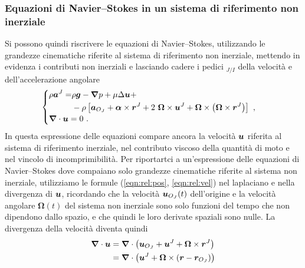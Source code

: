 \subsubsection{Equazioni di Navier--Stokes in un sistema di riferimento non inerziale}
Si possono quindi riscrivere le equazioni di Navier--Stokes, utilizzando le grandezze cinematiche riferite al sistema di riferimento non inerziale, mettendo in evidenza i contributi non inerziali e lasciando cadere i pedici $_{J/I}$ della velocità e dell'accelerazione angolare
\begin{equation}
\begin{cases}
\begin{aligned}
 \rho \bm{a}^J = &  \rho \bm{g} - \bm{\nabla} p + \mu \Delta \bm{u} + \\
               & - \rho \left[
   \bm{a}_{O_J} + \bm{\alpha} \times \bm{r}^J + 2~\bm{\Omega} \times \bm{u}^J + 
   \bm{\Omega} \times \left( \bm{\Omega} \times \bm{r}^J \right) 
             \right] \ ,
\end{aligned} \\
\bm{\nabla} \cdot \bm{u} = 0 \ .
\end{cases}
\end{equation}
In questa espressione delle equazioni compare ancora la velocità $\bm{u}$ riferita al sistema di riferimento inerziale, nel contributo viscoso della quantità di moto e nel vincolo di incomprimibilità.
Per riportartci a un'espressione delle equazioni di Navier--Stokes dove compaiano solo grandezze cinematiche riferite al sistema non inerziale, utilizziamo le formule (\ref{eqn:rel:pos}, \ref{eqn:rel:vel}) nel laplaciano e nella divergenza di $\bm{u}$, ricordando che la velocità $\bm{u}_{O_J}(t)$ dell'origine e la velocità angolare $\bm{\Omega}(t)$ del sistema non inerziale sono solo funzioni del tempo che non dipendono dallo spazio, e che quindi le loro derivate spaziali sono nulle.
%
La divergenza della velocità diventa quindi
\begin{equation}
\begin{aligned}
 \bm{\nabla} \cdot \bm{u} & = \bm{\nabla} \cdot \left( \bm{u}_{O_J} + \bm{u}^J + \bm{\Omega} \times \bm{r}^J \right) \\
            & = \bm{\nabla} \cdot \left( \bm{u}^J + \bm{\Omega} \times ( \bm{r} - \bm{r}_{O_J} ) \right) \\
\end{aligned}
\end{equation}

